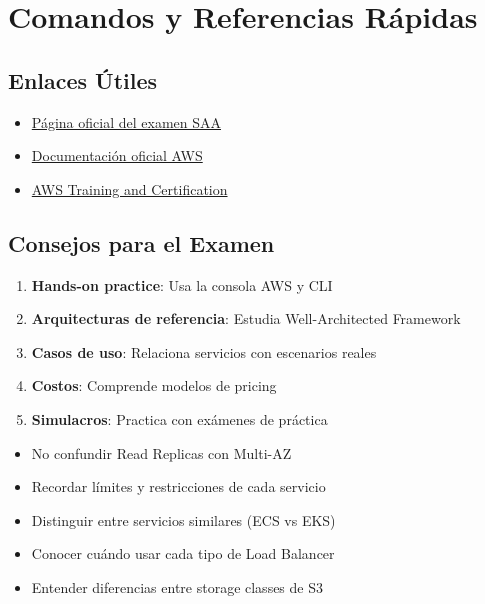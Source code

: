 \documentclass[12pt,a4paper]{report}
\begin{document}
\newpage

\appendix

\chapter{Comandos y Referencias Rápidas}

\section{Enlaces Útiles}

\begin{itemize}
    \item \href{https://aws.amazon.com/certification/certified-solutions-architect-associate/}{Página oficial del examen SAA}
    \item \href{https://docs.aws.amazon.com/}{Documentación oficial AWS}
    \item \href{https://aws.amazon.com/training/}{AWS Training and Certification}
\end{itemize}

\section{Consejos para el Examen}

\begin{tipbox}
\begin{enumerate}
    \item \textbf{Hands-on practice}: Usa la consola AWS y CLI
    \item \textbf{Arquitecturas de referencia}: Estudia Well-Architected Framework
    \item \textbf{Casos de uso}: Relaciona servicios con escenarios reales
    \item \textbf{Costos}: Comprende modelos de pricing
    \item \textbf{Simulacros}: Practica con exámenes de práctica
\end{enumerate}
\end{tipbox}

\begin{warningbox}
\begin{itemize}
    \item No confundir Read Replicas con Multi-AZ
    \item Recordar límites y restricciones de cada servicio
    \item Distinguir entre servicios similares (ECS vs EKS)
    \item Conocer cuándo usar cada tipo de Load Balancer
    \item Entender diferencias entre storage classes de S3
\end{itemize}
\end{warningbox}
\end{document}
